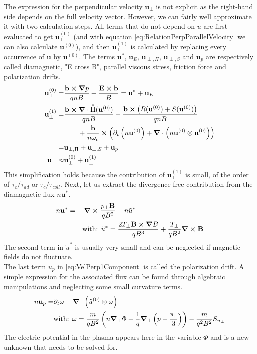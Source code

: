 The expression for the perpendicular velocity $\mathbf{u}_\perp$ is not explicit as the right-hand side depends on the full velocity vector. However, we can fairly well approximate it with two calculation steps. All terms that do not depend on $u$ are first evaluated to get $\mathbf{u}_\perp^{(0)}$ (and with equation \ref{eq:RelationPerpParallelVelocity} we can also calculate $\mathbf{u}^{(0)}$), and then $\mathbf{u}_\perp^{(1)}$ is calculated by replacing every occurrence of $\mathbf{u}$ by $\mathbf{u}^{(0)}$. The terms $\mathbf{u}^*$, $\mathbf{u}_E$, $\mathbf{u}_{\perp,\Pi}$, $\mathbf{u}_{\perp,S}$ and $\mathbf{u}_{p}$ are respectively called diamagnetic, "E cross B", parallel viscous stress, friction force and polarization drifts.
\begin{align}
	\mathbf{u}_\perp^{(0)} =& \frac{\mathbf{b}\cross\grad p}{qnB} + \frac{\mathbf{E}\cross\mathbf{b}}{B} = \mathbf{u}^* + \mathbf{u}_E \label{eq:VelPerp0Component} \\	
	\mathbf{u}_\perp^{(1)} =& \frac{\mathbf{b}\cross\grad\cdot\bar{\bar{\Pi}}(\mathbf{u}^{(0)})}{qnB} - \frac{\mathbf{b}\cross\left(R(\mathbf{u}^{(0)})+S(\mathbf{u}^{(0)})\right)}{qnB} \nonumber\\ & \qquad + \frac{\mathbf{b}}{n\omega_c} \cross \left(\partial_t \left(n\mathbf{u}^{(0)}\right) + \grad\cdot\left(n\mathbf{u}^{(0)}\otimes\mathbf{u}^{(0)}\right)\right) \nonumber \\
	=& \mathbf{u}_{\perp,\Pi} + \mathbf{u}_{\perp,S} + \mathbf{u}_{p} \label{eq:VelPerp1Component} \\
	\mathbf{u}_\perp \approx& \mathbf{u}_\perp^{(0)} + \mathbf{u}_\perp^{(1)}
\end{align}
This simplification holds because the contribution of $\mathbf{u}_\perp^{(1)}$ is small, of the order of $\tau_c / \tau_{ad}$ or $\tau_c / \tau_{coll}$. Next, let us extract the divergence free contribution from the diamagnetic flux $n\mathbf{u}^*$.
\begin{align}
	\label{eq:definitionDiamagneticDrift}
	n\mathbf{u}^* =& -\grad \cross \frac{p_\perp\mathbf{B}}{qB^2} + n\tilde{u}^* \nonumber\\
	& \quad\text{with: } \tilde{u}^* = \frac{2T_\perp\mathbf{B}\cross\grad B}{qB^3} + \frac{T_\perp}{qB^2}\grad\cross\mathbf{B}
\end{align}
The second term in $\tilde{u}^*$ is usually very small and can be neglected if magnetic fields do not fluctuate. \\
The last term $u_{p}$ in \autoref{eq:VelPerp1Component} is called the polarization drift. A simple expression for the associated flux can be found through algebraic manipulations and neglecting some small curvature terms.
\begin{align}
	n\mathbf{u}_{p} =& \partial_t\mathbf{\omega} - \grad\cdot\left(\tilde{u}^{(0)}\otimes\mathbf{\omega}\right) \nonumber \\
	&\text{with: } \mathbf{\omega} = \frac{m}{qB^2}\left(n\grad_\perp\Phi + \frac{1}{q}\grad_{\perp}\left(p-\frac{\pi_\parallel}{3}\right)\right) - \frac{m}{q^2B^2}S_{u_\perp} \label{eq:definitionSmallOmega}
\end{align}
The electric potential in the plasma appears here in the variable $\Phi$ and is a new unknown that needs to be solved for.

